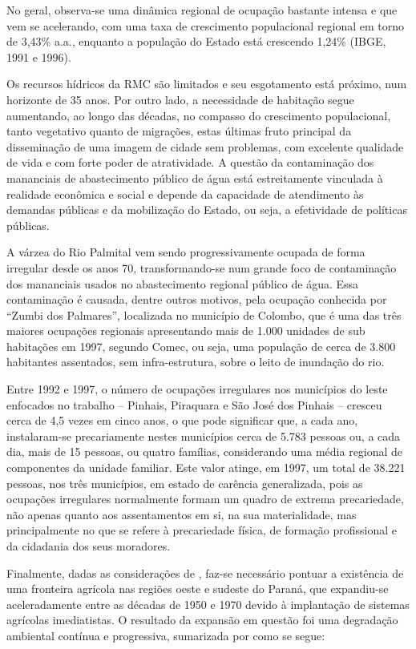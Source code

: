	No geral, observa-se uma dinâmica regional de ocupação bastante intensa e que vem se acelerando, com uma taxa de crescimento populacional regional em torno de 3,43\% a.a., enquanto a população do Estado está crescendo 1,24\% (IBGE, 1991 e 1996).
	
	Os recursos hídricos da RMC são limitados e seu esgotamento está próximo, num horizonte de 35 anos. Por outro lado, a necessidade de habitação segue aumentando, ao longo das décadas, no compasso do crescimento populacional, tanto vegetativo quanto de migrações, estas últimas fruto principal da disseminação de uma imagem de cidade sem problemas, com excelente qualidade de vida e com forte poder de atratividade. A questão da contaminação dos mananciais de abastecimento público de água está estreitamente vinculada à realidade econômica e social e depende da capacidade de atendimento às demandas públicas e da mobilização do Estado, ou seja, a efetividade de políticas públicas.
	
	A várzea do Rio Palmital vem sendo progressivamente ocupada de forma irregular desde os anos 70, transformando-se num grande foco de contaminação dos mananciais usados no abastecimento regional público de água. Essa contaminação é causada, dentre outros motivos, pela ocupação conhecida por “Zumbi dos Palmares”, localizada no município de Colombo, que é uma das três maiores ocupações regionais apresentando mais de 1.000 unidades de sub habitações em 1997, segundo Comec, ou seja, uma população de cerca de 3.800 habitantes assentados, sem infra-estrutura, sobre o leito de inundação do rio. 
	
	Entre 1992 e 1997, o número de ocupações irregulares nos municípios do leste enfocados no trabalho – Pinhais, Piraquara e São José dos Pinhais – cresceu cerca de 4,5 vezes em cinco anos, o que pode significar que, a cada ano, instalaram-se precariamente nestes municípios cerca de 5.783 pessoas ou, a cada dia, mais de 15 pessoas, ou quatro famílias, considerando uma média regional de componentes da unidade familiar. Este valor atinge, em 1997, um total de 38.221 pessoas, nos três municípios, em estado de carência generalizada, pois as ocupações irregulares normalmente formam um quadro de extrema precariedade, não apenas quanto aos assentamentos em si, na sua materialidade, mas principalmente no que se refere à precariedade física, de formação profissional e da cidadania dos seus moradores.
	
	Finalmente, dadas as considerações de , faz-se necessário pontuar a existência de uma fronteira agrícola nas regiões oeste e sudeste do Paraná, que expandiu-se aceleradamente entre as décadas de 1950 e 1970 devido à implantação de sistemas agrícolas imediatistas. O resultado da expansão em questão foi uma degradação ambiental contínua e progressiva, sumarizada por  como se segue:
	
